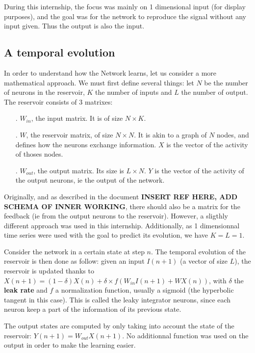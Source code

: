 \documentclass[11pt]{article}
\begin{document}
     During this internship, the focus was mainly on 1 dimensional input (for display purposes), and the goal was for the network to reproduce the signal without any input given. Thus the output is also the input.

   \subsection{A temporal evolution}
     In order to understand how the Network learns, let us consider a more mathematical approach. We must first define several things: let $N$ be the number of neurons in the reservoir, $K$ the number of inputs and $L$ the number of output. The reservoir consists of 3 matrixes: \begin{itemize}
       \item [.] $W_{in}$, the input matrix. It is of size $N \times K$.
       \item [.] $W$, the reservoir matrix, of size $N \times N$. It is akin to a graph of $N$ nodes, and defines how the neurons exchange information. $X$ is the vector of the activity of thoses nodes.
       \item [.] $W_{out}$, the output matrix. Its size is $L \times N$. $Y$ is the vector of the activity of the output neurons, ie the output of the network.
     \end{itemize}
     Originally, and as described in the document \textbf{INSERT REF HERE, ADD SCHEMA OF INNER WORKING}, there should also be a matrix for the feedback (ie from the output neurons to the reservoir). However, a sligthly different approach was used in this internship. Additionally, as 1 dimensionnal time series were used with the goal to predict its evolution, we have $K = L = 1$.

     Consider the network in a certain state at step $n$. The temporal evolution of the reservoir is then done as follow: given an input $I(n+1)$ (a vector of size $L$), the reservoir is updated thanks to $X(n+1) = (1-\delta)X(n) + \delta \times f( W_{in}I(n+1) + WX(n))$, with $\delta$ the \textbf{leak rate} and $f$ a normalization function, usually a sigmoid (the hyperbolic tangent in this case). This is called the leaky integrator neurons, since each neuron keep a part of the information of its previous state.

     The output states are computed by only taking into account the state of the reservoir: $Y(n+1) = W_{out}X(n+1)$. No additionnal function was used on the output in order to make the learning easier.
\end{document}
